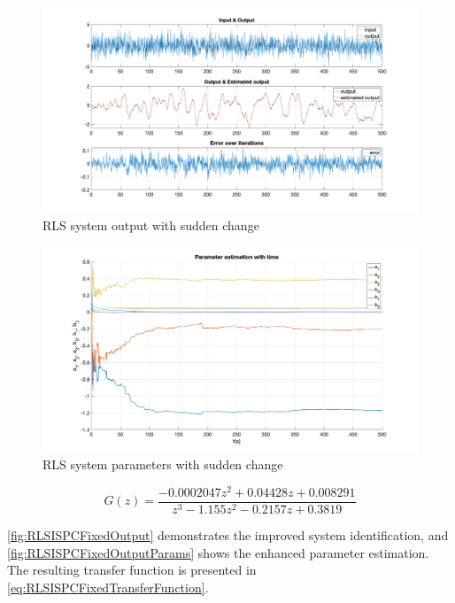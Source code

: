 \begin{figure}
\centering
\includegraphics[totalheight=8cm]{images/RLSISPCOutput.png}
\caption{RLS system output with sudden change}
\label{fig:RLSISPCOutput}
\end{figure}
\begin{figure}
\centering
\includegraphics[totalheight=8cm]{images/RLSISPCParams.png}
\caption{RLS system parameters with sudden change}
\label{fig:RLSISPCParams}
\end{figure}
\begin{equation}
G(z) =	\frac{-0.0002047 z^2 + 0.04428 z + 0.008291}{z^3 - 1.155 z^2 - 0.2157 z + 0.3819}
\label{eq:RLSISPCTransferFunction}
\end{equation}

\autoref{fig:RLSISPCFixedOutput} demonstrates the improved system identification, and \autoref{fig:RLSISPCFixedOutputParams} shows the enhanced parameter estimation. The resulting transfer function is presented in \autoref{eq:RLSISPCFixedTransferFunction}.

